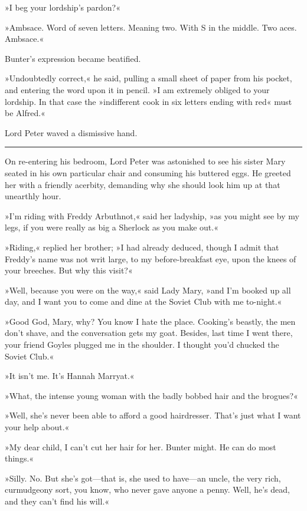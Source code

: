 »I beg your lordship's pardon?«

»Ambsace. Word of seven letters. Meaning two. With S in the middle. Two aces. Ambsace.«

Bunter's expression became beatified.

»Undoubtedly correct,« he said, pulling a small sheet of paper from his pocket, and entering the word upon it in pencil. »I am extremely obliged to your lordship. In that case the »indifferent cook in six letters ending with red« must be Alfred.«

Lord Peter waved a dismissive hand.

\noindent\hfil\rule{0.5\textwidth}{.4pt}\hfil 

On re-entering his bedroom, Lord Peter was astonished to see his sister Mary seated in his own particular chair and consuming his buttered eggs. He greeted her with a friendly acerbity, demanding why she should look him up at that unearthly hour.

»I'm riding with Freddy Arbuthnot,« said her ladyship, »as you might see by my legs, if you were really as big a Sherlock as you make out.«

»Riding,« replied her brother; »I had already deduced, though I admit that Freddy's name was not writ large, to my before-breakfast eye, upon the knees of your breeches. But why this visit?«

»Well, because you were on the way,« said Lady Mary, »and I'm booked up all day, and I want you to come and dine at the Soviet Club with me to-night.«

»Good God, Mary, why? You know I hate the place. Cooking's beastly, the men don't shave, and the conversation gets my goat. Besides, last time I went there, your friend Goyles plugged me in the shoulder. I thought you'd chucked the Soviet Club.«

»It isn't me. It's Hannah Marryat.«

»What, the intense young woman with the badly bobbed hair and the brogues?«

»Well, she's never been able to afford a good hairdresser. That's just what I want your help about.«

»My dear child, I can't cut her hair for her. Bunter might. He can do most things.«

»Silly. No. But she's got—that is, she used to have—an uncle, the very rich, curmudgeony sort, you know, who never gave anyone a penny. Well, he's dead, and they can't find his will.«


